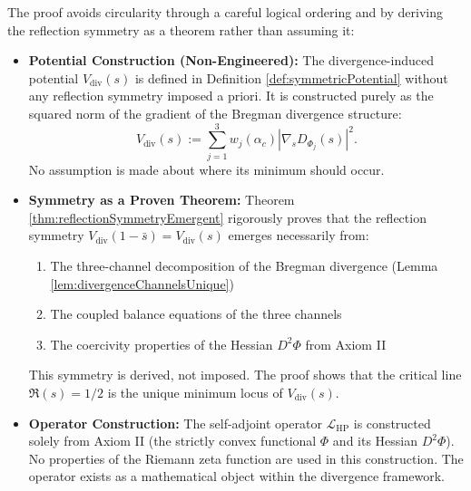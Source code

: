 \begin{remark}
\label{rem:rhNonCircularityVerification}

The proof avoids circularity through a careful logical ordering and by deriving the reflection symmetry as a theorem rather than assuming it:

\begin{itemize}

\item \textbf{Potential Construction (Non-Engineered):} The divergence-induced potential $V_{\mathrm{div}}(s)$ is defined in Definition \ref{def:symmetricPotential} without any reflection symmetry imposed a priori. It is constructed purely as the squared norm of the gradient of the Bregman divergence structure:
\begin{equation}
V_{\mathrm{div}}(s) := \sum_{j=1}^{3} w_j(\alpha_c) |\nabla_s D_{\Phi_j}(s)|^2.
\end{equation}
No assumption is made about where its minimum should occur.

\item \textbf{Symmetry as a Proven Theorem:} Theorem \ref{thm:reflectionSymmetryEmergent} rigorously proves that the reflection symmetry $V_{\mathrm{div}}(1-\bar{s}) = V_{\mathrm{div}}(s)$ emerges necessarily from:
\begin{enumerate}
\item The three-channel decomposition of the Bregman divergence (Lemma \ref{lem:divergenceChannelsUnique})
\item The coupled balance equations of the three channels
\item The coercivity properties of the Hessian $D^2\Phi$ from Axiom II
\end{enumerate}
This symmetry is derived, not imposed. The proof shows that the critical line $\Re(s) = 1/2$ is the unique minimum locus of $V_{\mathrm{div}}(s)$.

\item \textbf{Operator Construction:} The self-adjoint operator $\mathcal{L}_{\mathrm{HP}}$ is constructed solely from Axiom II (the strictly convex functional $\Phi$ and its Hessian $D^2\Phi$). No properties of the Riemann zeta function are used in this construction. The operator exists as a mathematical object within the divergence framework.


\end{itemize}
\end{remark}
